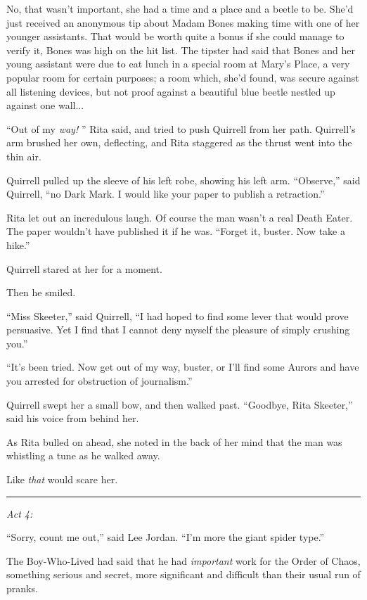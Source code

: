 No, that wasn't important, she had a time and a place and a beetle to
be. She'd just received an anonymous tip about Madam Bones making time
with one of her younger assistants. That would be worth quite a bonus if
she could manage to verify it, Bones was high on the hit list. The
tipster had said that Bones and her young assistant were due to eat
lunch in a special room at Mary's Place, a very popular room for certain
purposes; a room which, she'd found, was secure against all listening
devices, but not proof against a beautiful blue beetle nestled up
against one wall...

``Out of my \emph{way!} '' Rita said, and tried to push Quirrell from her
path. Quirrell's arm brushed her own, deflecting, and Rita staggered as
the thrust went into the thin air.

Quirrell pulled up the sleeve of his left robe, showing his left arm.
``Observe,'' said Quirrell, ``no Dark Mark. I would like your paper to
publish a retraction.''

Rita let out an incredulous laugh. Of course the man wasn't a real Death
Eater. The paper wouldn't have published it if he was. ``Forget it,
buster. Now take a hike.''

Quirrell stared at her for a moment.

Then he smiled.

``Miss Skeeter,'' said Quirrell, ``I had hoped to find some lever that
would prove persuasive. Yet I find that I cannot deny myself the
pleasure of simply crushing you.''

``It's been tried. Now get out of my way, buster, or I'll find some
Aurors and have you arrested for obstruction of journalism.''

Quirrell swept her a small bow, and then walked past. ``Goodbye, Rita
Skeeter,'' said his voice from behind her.

As Rita bulled on ahead, she noted in the back of her mind that the man
was whistling a tune as he walked away.

Like \emph{that} would scare her.

\begin{center}\rule{3in}{0.4pt}\end{center}

\emph{Act 4:}

``Sorry, count me out,'' said Lee Jordan. ``I'm more the giant spider
type.''

The Boy-Who-Lived had said that he had \emph{important} work for the
Order of Chaos, something serious and secret, more significant and
difficult than their usual run of pranks.

